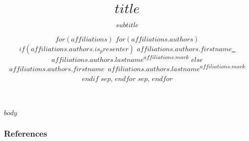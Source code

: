 \documentclass[%
	USenglish,  %
]{beamer}
\title[$short_title$]{$title$}
\subtitle{$subtitle$}
\author[%
$for(affiliations)$
$for(affiliations.authors)$
$if(affiliations.authors.is_presenter)$
{$affiliations.authors.firstname$ \textsc{$affiliations.authors.lastname$}}
$endif$
$endfor$
$endfor$
]{%
$for(affiliations)$
$for(affiliations.authors)$
$if(affiliations.authors.is_presenter)$
{\underline{$affiliations.authors.firstname$~\textsc{$affiliations.authors.lastname$}}\textsuperscript{$affiliations.mark$}}
$else$
{$affiliations.authors.firstname$~\textsc{$affiliations.authors.lastname$}\textsuperscript{$affiliations.mark$}}
$endif$
$sep$,
$endfor$
$sep$,
$endfor$
}
\institute[
$for(affiliations)$
$affiliations.name$ $sep$,
$endfor$
]{
$for(affiliations)$
{
\textsuperscript{$affiliations.mark$}$affiliations.signature$\\
\texttt{$affiliations.email$}}\\$sep$
$endfor$
}
\date[\talkdate]{\printdate{\talkdate}}
\begin{document}
\begin{frame}[plain]
	\titlepage
\end{frame}

$body$

\begin{frame}[allowframebreaks]
    \frametitle{References}
	\printbibliography
\end{frame}
\end{document}

